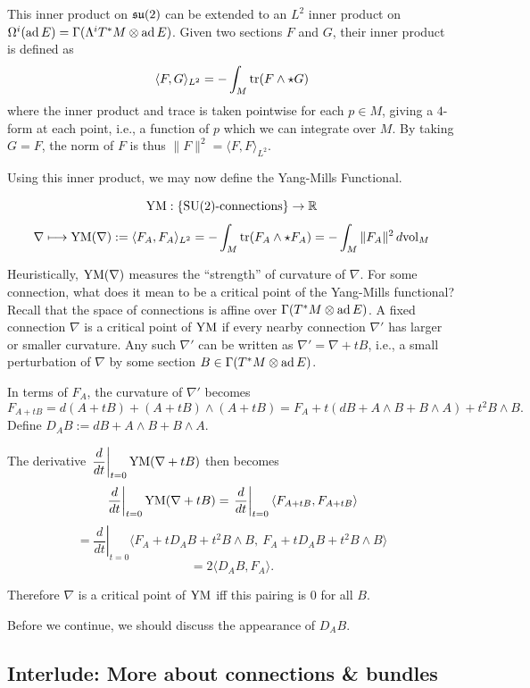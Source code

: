 \documentclass[main]{subfiles}
\begin{document}
This inner product on $\mathfrak{su}(2)$ can be extended to an $L^2$ inner product on $\Omega^i(\operatorname{ad} E) = \Gamma(\Lambda^i T^\ast M\otimes \operatorname{ad} E)$. Given two sections $F$ and $G$, their inner product is defined as
\[
\langle F,G\rangle_{L^2} = -\int_M \operatorname{tr}(F\wedge\star G)
\]
where the inner product and trace is taken pointwise for each $p\in M$, giving a $4$-form at each point, i.e., a function of $p$ which we can integrate over $M$. By taking $G=F$, the norm of $F$ is thus $\|F\|^2 = \langle F,F\rangle_{L^2}$.

Using this inner product, we may now define the Yang-Mills Functional.

\begin{definition}
\[
\operatorname{YM} : \{\operatorname{SU}(2)\text{-connections}\} \to \mathbb R
\]
\[
\nabla \longmapsto \operatorname{YM}(\nabla) := \langle F_A,F_A\rangle_{L^2} = -\int_M \operatorname{tr}(F_A\wedge\star F_A) = -\int_M \|F_A\|^2\, d\mathrm{vol}_M
\]
\end{definition}

Heuristically, $\operatorname{YM}(\nabla)$ measures the ``strength'' of curvature of $\nabla$. For some connection, what does it mean to be a critical point of the Yang-Mills functional? Recall that the space of connections is affine over $\Gamma(T^\ast M\otimes \operatorname{ad} E)$. A fixed connection $\nabla$ is a critical point of $\operatorname{YM}$ if every nearby connection $\nabla'$ has larger or smaller curvature. Any such $\nabla'$ can be written as $\nabla' = \nabla+tB$, i.e., a small perturbation of $\nabla$ by some section $B\in\Gamma(T^\ast M\otimes \operatorname{ad} E)$.

In terms of $F_A$, the curvature of $\nabla'$ becomes
\[
F_{A+tB} = d(A+tB)+(A+tB)\wedge(A+tB) = F_A + t(dB+A\wedge B+B\wedge A) + t^2 B\wedge B.
\]
Define $D_A B := dB+A\wedge B+B\wedge A$.

The derivative $\left.\dfrac{d}{dt}\right|_{t=0} \operatorname{YM}(\nabla+tB)$ then becomes
\[
\left.\frac{d}{dt}\right|_{t=0} \operatorname{YM}(\nabla+tB) = \left.\frac{d}{dt}\right|_{t=0} \langle F_{A+tB}, F_{A+tB}\rangle
\]
\[
= \left.\frac{d}{dt}\right|_{t=0} \langle F_A+tD_AB+t^2B\wedge B,\ F_A+tD_AB+t^2B\wedge B\rangle
\]
\[
= 2\langle D_AB, F_A\rangle.
\]

Therefore $\nabla$ is a critical point of $\operatorname{YM}$ iff this pairing is $0$ for all $B$.

Before we continue, we should discuss the appearance of $D_AB$.

\subsection*{Interlude: More about connections \& bundles}
\end{document}
